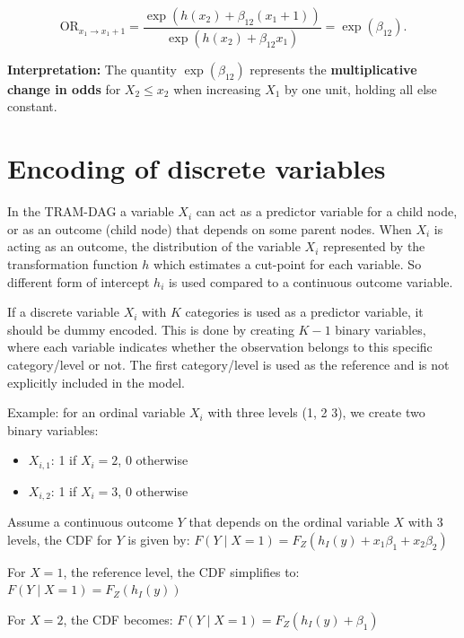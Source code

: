 \begin{equation}
\text{OR}_{x_1 \to x_1 + 1} = 
\frac{\exp(h(x_2) + \beta_{12}(x_1 + 1))}{\exp(h(x_2) + \beta_{12} x_1)} 
= \exp(\beta_{12}).
\end{equation}

\noindent\textbf{Interpretation:} The quantity \( \exp(\beta_{12}) \) represents the \textbf{multiplicative change in odds} for \( X_2 \le x_2 \) when increasing \( X_1 \) by one unit, holding all else constant.



\section{Encoding of discrete variables} \label{sec:encoding_discrete_variables}

In the TRAM-DAG a variable $X_i$ can act as a predictor variable for a child node, or as an outcome (child node) that depends on some parent nodes. When $X_i$ is acting as an outcome, the distribution of the variable $X_i$ represented by the transformation function $h$ which estimates a cut-point for each variable. So different form of intercept $h_i$ is used compared to a continuous outcome variable.

If a discrete variable $X_i$ with $K$ categories is used as a predictor variable, it should be dummy encoded. This is done by creating $K-1$ binary variables, where each variable indicates whether the observation belongs to this specific category/level or not. The first category/level is used as the reference and is not explicitly included in the model.

Example: for an ordinal variable $X_i$ with three levels (1, 2 3), we create two binary variables:

\begin{itemize}
  \item $X_{i,1}$: 1 if $X_i = 2$, 0 otherwise
  \item $X_{i,2}$: 1 if $X_i = 3$, 0 otherwise
\end{itemize}

Assume a continuous outcome $Y$ that depends on the ordinal variable $X$ with 3 levels, the CDF for $Y$ is given by: 
$F(Y \mid X=1) = F_Z(h_I(y) + x_1\beta_1 + x_2\beta_2)$ 

For $X=1$, the reference level, the CDF simplifies to: 
$F(Y \mid X=1) = F_Z(h_I(y))$

For $X=2$, the CDF becomes: $F(Y \mid X=1) = F_Z(h_I(y) + \beta_1)$

